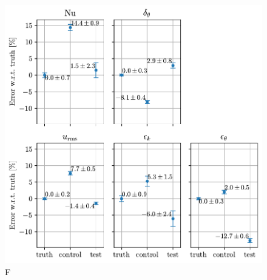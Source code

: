 \documentclass[../main.tex]{subfiles}
\begin{document}
\begin{figure}[ht]
    \centering
    \includegraphics[width=0.65\linewidth]{figures/stats_vs_fine.pdf}
    \caption{
        F
    }
    \label{fig:stats_vs_fine}
\end{figure}

\ifSubfilesClassLoaded{%
    \emergencystretch=5em
    \printbibliography{}
}{}
\end{document}

